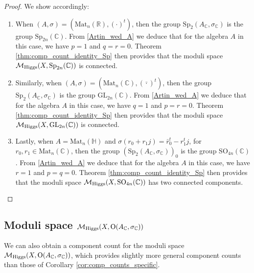 \documentclass[oneside,11pt]{amsart}
\theoremstyle{definition}
\theoremstyle{remark}
\numberwithin{thm}{section}
\numberwithin{equation}{section}
\begin{document}
\begin{proof}  
We show accordingly: 
\begin{enumerate}
\item  When $(A,\sigma)=(\mathrm{Mat}_n(\mathbb{R}),(\cdot)^{t})$, then the group $\mathrm{Sp}_2(A_\mathbb{C}, \sigma_{\mathbb{C}}) $ is the group $\mathrm{Sp}_{2n}(\mathbb{C})$. From \eqref{Artin_wed_A}
we deduce that for the algebra $A$ in this case, we have $p=1$ and $q=r=0$. Theorem \ref{thm:comp_count_identity_Sp} then provides that the moduli space $\mathcal{M}_{\rm Higgs}(X,\mathrm{Sp}_{2n}(\mathbb{C}))$ is connected.

\item Similarly, when $(A,\sigma)=(\mathrm{Mat}_n(\mathbb{C}),(\bar{\cdot})^{t})$, then the group $\mathrm{Sp}_2(A_\mathbb{C}, \sigma_{\mathbb{C}}) $ is the group $\mathrm{GL}_{2n}(\mathbb{C})$. From \eqref{Artin_wed_A}
we deduce that for the algebra $A$ in this case, we have $q=1$ and $p=r=0$. Theorem \ref{thm:comp_count_identity_Sp} then provides that the moduli space $\mathcal{M}_{\rm Higgs}(X,\mathrm{GL}_{2n}(\mathbb{C}))$ is connected.

\item Lastly, when $A=\mathrm{Mat}_n(\mathbb{H})$ and $\sigma(r_0+r_1j)=\bar r_0^t- r_1^tj$, for $r_0,r_1\in\mathrm{Mat}_n(\mathbb C)$, then the group $(\mathrm{Sp}_2(A_\mathbb{C}, \sigma_{\mathbb{C}}))_0 $ is the group $\mathrm{SO}_{4n}(\mathbb{C})$. From \eqref{Artin_wed_A}
we deduce that for the algebra $A$ in this case, we have $r=1$ and $p=q=0$. Theorem \ref{thm:comp_count_identity_Sp} then provides that the moduli space $\mathcal{M}_{\rm Higgs}(X,\mathrm{SO}_{4n}(\mathbb{C}))$ has two connected components.
\end{enumerate}



\end{proof}



\subsection{Moduli space \texorpdfstring{$\mathcal{M}_{\rm Higgs}(X,\mathrm{O}(A_\mathbb{C}, \sigma_{\mathbb{C}}))$}{for orthogonal group}}

We can also obtain a component count for the moduli space $\mathcal{M}_{\rm Higgs}(X,\mathrm{O}(A_\mathbb{C}, \sigma_{\mathbb{C}}))$, which provides slightly more general component counts than those of Corollary \ref{cor:comp_counts_specific}.
\end{document}
